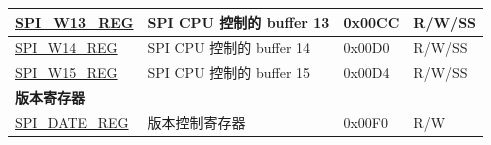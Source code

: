 \begin{longtable}{ | p{6cm} | p{6.2cm} | p{1.3cm} | p{2cm} | }
\hyperref[regdesc:SPIW13REG]{SPI\_W13\_REG} & SPI CPU 控制的 buffer 13 & 0x00CC & R/W/SS \\ \hline
\hyperref[regdesc:SPIW14REG]{SPI\_W14\_REG} & SPI CPU 控制的 buffer 14 & 0x00D0 & R/W/SS \\ \hline
\hyperref[regdesc:SPIW15REG]{SPI\_W15\_REG} & SPI CPU 控制的 buffer 15 & 0x00D4 & R/W/SS \\ \hline
\multicolumn{4}{|l|}{\textbf{版本寄存器}} \\ \hline
\hyperref[regdesc:SPIDATEREG]{SPI\_DATE\_REG} & 版本控制寄存器 & 0x00F0 & R/W \\ \hline
\end{longtable}
